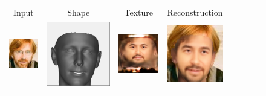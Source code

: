 \begin{figure}[t!]
\begin{center}
\small
\setlength{\tabcolsep}{3pt}
\begin{tabular}{ @{\hskip 1.5mm}c@{\hskip 1.5mm}c@{\hskip 1.5mm}c@{\hskip 1.5mm}c@{}c@{}c@{}c@{\hskip 1.5mm}c@{}}
Input & Shape & Texture & Reconstruction \\
\includegraphics[width=\FittingFigWid]{img/results/CelebA/pred_CelebA_tex_118_in.png} &
\includegraphics[trim=3 3 3 3,clip,width=\FittingFigShapeWid]{img/results/CelebA/pred_CelebA_shape_118.png} &
\includegraphics[width=\FittingFigWid]{img/results/CelebA/pred_CelebA_tex_118.png} &
\includegraphics[width=\FittingFigWid]{img/results/CelebA/pred_CelebA_tex_118_img.png} &
\\

\end{tabular}
\end{center}
\end{figure}
